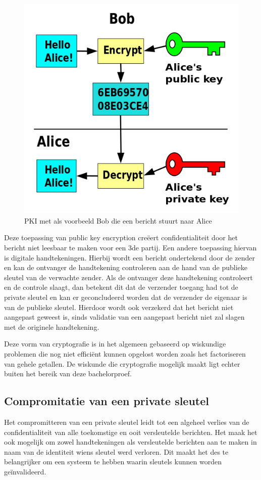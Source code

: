 \begin{figure}[H]
	\includegraphics{img/pki-alice-and-bob}
	\centering
	\caption{\gls{PKI} met als voorbeeld Bob die een bericht stuurt naar Alice}
	\label{fig:pki-alice-and-bob}
\end{figure}

Deze toepassing van public key encryption creëert confidentialiteit door het
bericht niet leesbaar te maken voor een 3de partij. Een andere toepassing
hiervan is digitale handtekeningen. Hierbij wordt een bericht ondertekend door
de zender en kan de ontvanger de handtekening controleren aan de hand van de
publieke sleutel van de verwachte zender. Als de ontvanger deze handtekening
controleert en de controle slaagt, dan betekent dit dat de verzender toegang had
tot de private sleutel en kan er geconcludeerd worden dat de verzender de
eigenaar is van de publieke sleutel. Hierdoor wordt ook verzekerd dat het
bericht niet aangepast geweest is, sinds validatie van een aangepast bericht
niet zal slagen met de originele handtekening.

Deze vorm van cryptografie is in het algemeen gebaseerd op wiskundige problemen
die nog niet efficiënt kunnen opgelost worden zoals het factoriseren van gehele
getallen. De wiskunde die cryptografie mogelijk maakt ligt echter buiten het
bereik van deze bachelorproef.

\subsection{Compromitatie van een private sleutel}
\label{subsec:comprimitatie-van-een-private-sleutel}
Het compromitteren van een private sleutel leidt tot een algeheel verlies van de
confidentialiteit van alle toekomstige en ooit versleutelde berichten. Het maak
het ook mogelijk om zowel handtekeningen als versleutelde berichten aan te maken
in naam van de identiteit wiens sleutel werd verloren. Dit maakt het des te
belangrijker om een systeem te hebben waarin sleutels kunnen worden
geïnvalideerd.

